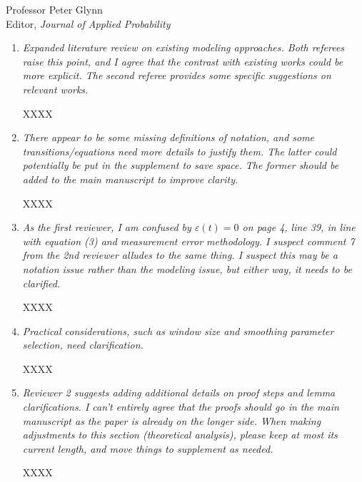 \documentclass[11pt]{letter} %
\begin{document}
\begin{letter}{Professor
	Peter Glynn\\
	Editor, {\em Journal of Applied Probability}}
\begin{enumerate}
\item {\it Expanded literature review on existing modeling approaches. Both referees raise this point, and I agree that the contrast with existing works could be more explicit. The second referee provides some specific suggestions on relevant works.}

\vspace{5mm}
XXXX
\vspace{5mm}

\item {\it There appear to be some missing definitions of notation, and some transitions/equations need more details to justify them. The latter could potentially be put in the supplement to save space. The former should be added to the main manuscript to improve clarity.}

\vspace{5mm}
XXXX
\vspace{5mm}

\item {\it As the first reviewer, I am confused by $\varepsilon(t) = 0$ on page 4, line 39, in line with equation (3) and measurement error methodology. I suspect comment 7 from the 2nd reviewer alludes to the same thing. I suspect this may be a notation issue rather than the modeling issue, but either way, it needs to be clarified.}

\vspace{5mm}
XXXX
\vspace{5mm}

\item {\it Practical considerations, such as window size and smoothing parameter selection, need clarification.}

\vspace{5mm}
XXXX
\vspace{5mm}

\item {\it Reviewer 2 suggests adding additional details on proof steps and lemma clarifications. I can't entirely agree that the proofs should go in the main manuscript as the paper is already on the longer side. When making adjustments to this section (theoretical analysis), please keep at most its current length, and move things to supplement as needed.}

\vspace{5mm}
XXXX
\vspace{5mm}


\end{enumerate}
\end{letter}
\end{document}
